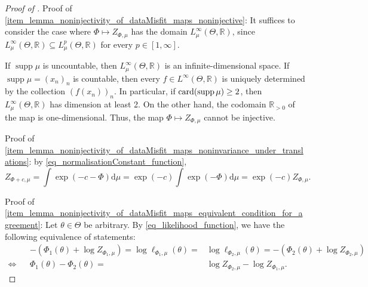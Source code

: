 \documentclass[a4paper]{scrartcl}
\theoremstyle{definition}
\numberwithin{equation}{section}
\newcommand{\R}{\mathbb{R}}
\newcommand{\rd}{\mathrm{d}}
\newcommand{\card}[1]{\textup{card}({#1})}
\DeclareMathOperator{\supp}{supp}
\begin{document}
\LemmaNoninjectivityMisfitMaps*
\begin{proof}[Proof of ]
 Proof of \cref{item_lemma_noninjectivity_of_dataMisfit_maps_noninjective}: It suffices to consider the case where $\Phi\mapsto Z_{\Phi,\mu}$ has the domain $L^\infty_\mu(\Theta,\R)$, since $L^\infty_\mu(\Theta,\R)\subseteq L^p_\mu(\Theta,\R)$ for every $p\in[1,\infty]$.
 
 If $\supp{\mu}$ is uncountable, then $L^\infty_\mu(\Theta,\R)$ is an infinite-dimensional space. 
 If $\supp{\mu}=(x_n)_{n}$ is countable, then every $f\in L^\infty(\Theta,\R)$ is uniquely determined by the collection $(f(x_n))_{n}$. In particular, if $\card{\supp{\mu}}\geq 2$, then $L^\infty_\mu(\Theta,\R)$ has dimension at least 2. 
 On the other hand, the codomain $\R_{>0}$ of the map is one-dimensional. Thus, the map $\Phi\mapsto Z_{\Phi,\mu}$ cannot be injective.

 Proof of \cref{item_lemma_noninjectivity_of_dataMisfit_maps_noninvariance_under_translations}: by \eqref{eq_normalisationConstant_function},
 \begin{equation*}
  Z_{\Phi+c,\mu}=\int \exp(-c-\Phi)\rd \mu =\exp(-c)\int \exp(-\Phi)\rd \mu=\exp(-c)Z_{\Phi,\mu}.
 \end{equation*}

 Proof of \cref{item_lemma_noninjectivity_of_dataMisfit_maps_equivalent_condition_for_agreement}: Let $\theta\in\Theta$ be arbitrary. By \eqref{eq_likelihood_function}, we have the following equivalence of statements: 
 \begin{align*}
   & & -(\Phi_1(\theta)+\log Z_{\Phi_1,\mu})=\log \ell_{\Phi_1,\mu}(\theta)=&\log \ell_{\Phi_2,\mu}(\theta)=-(\Phi_2(\theta)+\log Z_{\Phi_2,\mu}) & & \text{}
  \\
  \Longleftrightarrow & & \Phi_1(\theta)-\Phi_2(\theta) =& \log Z_{\Phi_2,\mu}-\log Z_{\Phi_1,\mu}.
 \end{align*}
\end{proof}
\end{document}
